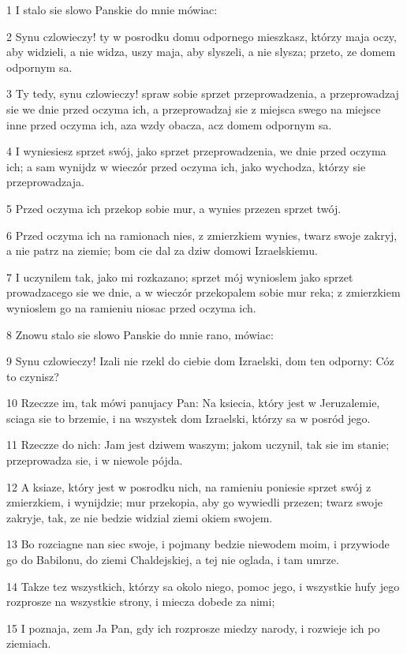 \par 1 I stalo sie slowo Panskie do mnie mówiac:
\par 2 Synu czlowieczy! ty w posrodku domu odpornego mieszkasz, którzy maja oczy, aby widzieli, a nie widza, uszy maja, aby slyszeli, a nie slysza; przeto, ze domem odpornym sa.
\par 3 Ty tedy, synu czlowieczy! spraw sobie sprzet przeprowadzenia, a przeprowadzaj sie we dnie przed oczyma ich, a przeprowadzaj sie z miejsca swego na miejsce inne przed oczyma ich, aza wzdy obacza, acz domem odpornym sa.
\par 4 I wyniesiesz sprzet swój, jako sprzet przeprowadzenia, we dnie przed oczyma ich; a sam wynijdz w wieczór przed oczyma ich, jako wychodza, którzy sie przeprowadzaja.
\par 5 Przed oczyma ich przekop sobie mur, a wynies przezen sprzet twój.
\par 6 Przed oczyma ich na ramionach nies, z zmierzkiem wynies, twarz swoje zakryj, a nie patrz na ziemie; bom cie dal za dziw domowi Izraelskiemu.
\par 7 I uczynilem tak, jako mi rozkazano; sprzet mój wynioslem jako sprzet prowadzacego sie we dnie, a w wieczór przekopalem sobie mur reka; z zmierzkiem wynioslem go na ramieniu niosac przed oczyma ich.
\par 8 Znowu stalo sie slowo Panskie do mnie rano, mówiac:
\par 9 Synu czlowieczy! Izali nie rzekl do ciebie dom Izraelski, dom ten odporny: Cóz to czynisz?
\par 10 Rzeczze im, tak mówi panujacy Pan: Na ksiecia, który jest w Jeruzalemie, sciaga sie to brzemie, i na wszystek dom Izraelski, którzy sa w posród jego.
\par 11 Rzeczze do nich: Jam jest dziwem waszym; jakom uczynil, tak sie im stanie; przeprowadza sie, i w niewole pójda.
\par 12 A ksiaze, który jest w posrodku nich, na ramieniu poniesie sprzet swój z zmierzkiem, i wynijdzie; mur przekopia, aby go wywiedli przezen; twarz swoje zakryje, tak, ze nie bedzie widzial ziemi okiem swojem.
\par 13 Bo rozciagne nan siec swoje, i pojmany bedzie niewodem moim, i przywiode go do Babilonu, do ziemi Chaldejskiej, a tej nie oglada, i tam umrze.
\par 14 Takze tez wszystkich, którzy sa okolo niego, pomoc jego, i wszystkie hufy jego rozprosze na wszystkie strony, i miecza dobede za nimi;
\par 15 I poznaja, zem Ja Pan, gdy ich rozprosze miedzy narody, i rozwieje ich po ziemiach.
